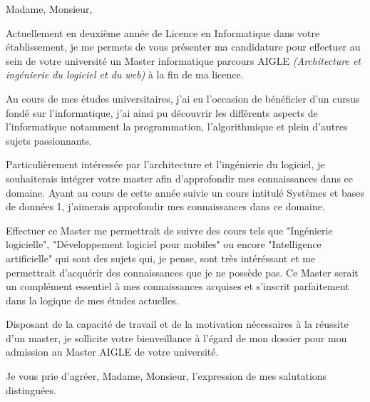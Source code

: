 \documentclass[11pt]{lettre}
\makeatletter
\newcommand*{\NoRule}{\renewcommand*{\rule@length}{0}}
\makeatother
\begin{document}
\begin{letter}{
}
\NoRule
{}
\address{Bérénice Lemoine\\32, rue de la Méditerranée\\34000 Montpellier}
\nofax

\def\concname{Objet : } %
\opening{Madame, Monsieur,}

Actuellement en deuxième année de Licence en Informatique dans votre établissement, je me permets de vous présenter ma candidature pour effectuer au sein de votre université un Master informatique parcours AIGLE \textit{(Architecture et ingénierie du logiciel et du web)} à la fin de ma licence.

Au cours de mes études universitaires, j'ai eu l'occasion de bénéficier d'un cursus fondé sur l'informatique, j'ai ainsi pu découvrir les différents aspects de l'informatique notamment la programmation, l'algorithmique et plein d'autres sujets passionnants.

Particulièrement intéressée par l'architecture et l'ingénierie du logiciel, je souhaiterais intégrer votre master afin d'approfondir mes connaissances dans ce domaine.  Ayant au cours de cette année suivie un cours intitulé Systèmes et bases de données 1, j'aimerais approfondir mes connaissances dans ce domaine. 

Effectuer ce Master me permettrait de suivre des cours tels que "Ingénierie logicielle", "Développement logiciel pour mobiles" ou encore "Intelligence artificielle" qui sont des sujets qui, je pense, sont très intéréssant et me permettrait d'acquérir des connaissances que je ne possède pas. Ce Master serait un complément essentiel à mes connaissances acquises et s'inscrit parfaitement dans la logique de mes études actuelles.

Disposant de la capacité de travail et de la motivation nécessaires à la réussite d’un master, je sollicite votre bienveillance à l’égard de mon dossier pour mon admission au Master AIGLE de votre université.

\closing{Je vous prie d'agréer,
Madame, Monsieur, l'expression de
mes salutations distinguées.}

\end{letter}
\end{document}
